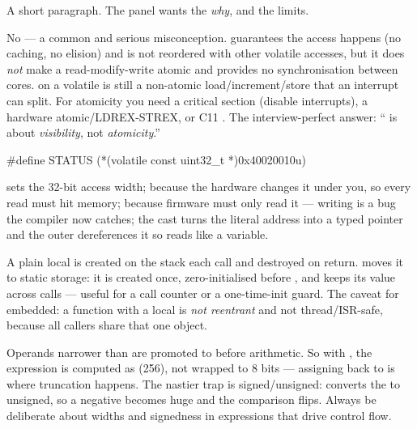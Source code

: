 %
{A short paragraph. The panel wants the \emph{why}, and the limits.}

No --- a common and serious misconception.  guarantees the
access happens (no caching, no elision) and is not reordered with other
volatile accesses, but it does \emph{not} make a read-modify-write atomic and
provides no synchronisation between cores.  on a volatile is
still a non-atomic load/increment/store that an interrupt can split. For
atomicity you need a critical section (disable interrupts), a hardware
atomic/LDREX-STREX, or C11 . The interview-perfect answer:
`` is about \emph{visibility}, not \emph{atomicity}.''

\begin{cgym}
#define STATUS (*(volatile const uint32_t *)0x40020010u)
\end{cgym}
 sets the 32-bit access width;  because the
hardware changes it under you, so every read must hit memory; 
because firmware must only read it --- writing is a bug the compiler now
catches; the cast turns the literal address into a typed pointer and the outer
\code{*} dereferences it so  reads like a variable.

A plain local is created on the stack each call and destroyed on return.
 moves it to static storage: it is created once, zero-initialised
before , and keeps its value across calls --- useful for a call
counter or a one-time-init guard. The caveat for embedded: a function with a
 local is \emph{not reentrant} and not thread/ISR-safe, because
all callers share that one object.

Operands narrower than  are promoted to  before
arithmetic. So with , the expression
 is computed as  (256), not wrapped to 8 bits ---
assigning back to  is where truncation happens. The nastier
trap is signed/unsigned:  converts the
 to unsigned, so a negative  becomes huge and the
comparison flips. Always be deliberate about widths and signedness in
expressions that drive control flow.


